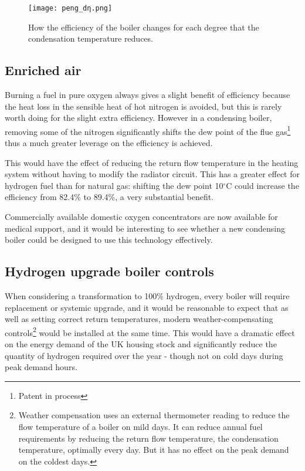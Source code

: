 \documentclass[5p]{elsarticle} %
\begin{document}
\begin{figure}[htb]
\centering
\texttt{[image: peng\_dη.png]}
\caption{How the efficiency of the boiler changes for each degree that the condensation temperature reduces.}
\label{fig:gradient}
\end{figure}

\subsection{Enriched air}
Burning a fuel in pure oxygen always gives a slight benefit of efficiency because the heat loss in the sensible heat of hot nitrogen is avoided, but this is rarely worth doing for the slight extra efficiency. However in a condensing boiler, removing some of the nitrogen significantly shifts the dew point of the flue gas\footnote{Patent in process} thus a much greater leverage on the efficiency is achieved.

This would have the effect of reducing the  return flow temperature in the heating system without having to modify the radiator circuit. This has a greater effect for hydrogen fuel than for natural gas: shifting the dew point 10$^\circ$C could increase the efficiency from 82.4\% to 89.4\%, a very substantial benefit.

Commercially available domestic oxygen concentrators are now available for medical support, and it would be interesting to see whether a new condensing boiler could be designed to use this technology effectively.


\subsection{Hydrogen upgrade boiler controls}
\label{appendix:h2controls}
When considering a transformation to 100\% hydrogen, every boiler will require replacement or systemic upgrade, and it would be reasonable to expect that as well as setting correct return temperatures, modern weather-compensating controls\footnote{
Weather compensation uses an external thermometer reading to reduce the flow temperature of a boiler on mild days. It can reduce annual fuel requirements by reducing the return flow temperature, the condensation temperature, optimally every day. But it has no effect on the peak demand on the coldest days.
}
would be installed at the same time. This would have a dramatic effect on the energy demand of the UK housing stock and  significantly reduce the quantity of hydrogen required over the  year - though not on cold days during peak demand hours.
\end{document}
